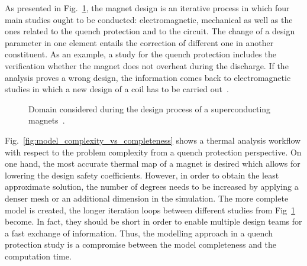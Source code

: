 As presented in Fig.~\ref{fig:magnet_design_domains}, the magnet design is an iterative process in which four main studies ought to be conducted: electromagnetic, mechanical as well as the ones related to the quench protection and to the circuit. The change of a design parameter in one element entails the correction of different one in another constituent. As an example, a study for the quench protection includes the verification whether the magnet does not overheat during the discharge. If the analysis proves a wrong design, the information comes back to electromagnetic studies in which a new design of a coil has to be carried out~\cite{quench_protection_system_applied_prioli}.

\begin{figure}[H]
    \centering
    \caption{Domain considered during the design process of a superconducting magnets~\cite{quench_protection_system_applied_prioli}.}
    \label{fig:magnet_design_domains}
\end{figure}

Fig.~\ref{fig:model_complexity_vs_completeness} shows a thermal analysis workflow with respect to the problem complexity from a quench protection perspective. On one hand, the most accurate thermal map of a magnet is desired which allows for lowering the design safety coefficients. However, in order to obtain the least approximate solution, the number of degrees needs to be increased by applying a denser mesh or an additional dimension in the simulation. The more complete model is created, the longer iteration loops between different studies from Fig~\ref{fig:magnet_design_domains} become. In fact, they should be short in order to enable multiple design teams for a fast exchange of information. Thus, the modelling approach in a quench protection study is a compromise between the model completeness and the computation time.

